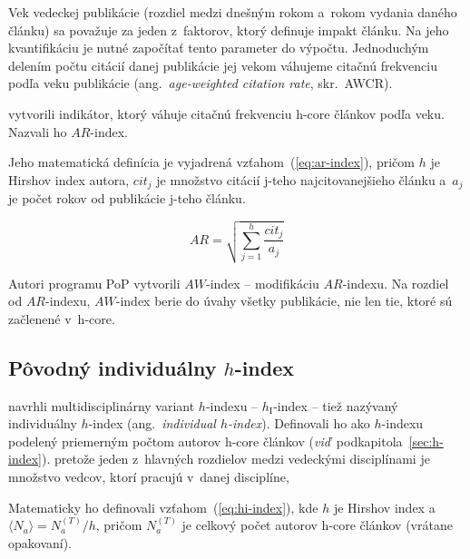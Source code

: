 Vek vedeckej publikácie (rozdiel medzi dnešným rokom a~rokom vydania daného
článku) sa považuje za jeden z~faktorov, ktorý definuje impakt článku.  Na jeho
kvantifikáciu je nutné započítať tento parameter do výpočtu.  Jednoduchým
delením počtu citácií danej publikácie jej vekom váhujeme citačnú frekvenciu
podľa veku publikácie (ang.~\emph{age-weighted citation rate}, skr.~AWCR).

\citet{Jin2007} vytvorili indikátor, ktorý váhuje citačnú frekvenciu h-core
článkov podľa veku.  Nazvali ho $\mathit{AR}$-index.

Jeho matematická definícia je vyjadrená vzťahom~(\ref{eq:ar-index}), pričom $h$
je Hirshov index autora, $\mathit{cit}_j$ je množstvo citácií j-teho
najcitovanejšieho článku a~$a_j$ je počet rokov od publikácie j-teho článku.

\begin{equation}
\label{eq:ar-index}
\mathit{AR} = \sqrt{\sum_{j=1}^h{\frac{\mathit{cit}_j}{a_j}}}
\end{equation}

Autori programu PoP 
vytvorili $\mathit{AW}$-index -- modifikáciu $\mathit{AR}$-indexu.  Na rozdiel
od $\mathit{AR}$-indexu, $\mathit{AW}$-index berie do úvahy všetky publikácie,
nie len tie, ktoré sú začlenené v~h-core.


\subsection{Pôvodný individuálny $h$-index}
\label{sec:hi-index}

\citet{Batista2006} navrhli multidisciplinárny variant
$h$-indexu -- $h_{\mathrm{I}}$-index -- tiež nazývaný individuálny $h$-index
(ang.~\emph{individual $h$-index}).  Definovali ho ako $h$-indexu podelený
priemerným počtom autorov h-core článkov
(\emph{viď}~podkapitola~\ref{sec:h-index}).  pretože jeden z~hlavných rozdielov
medzi vedeckými disciplínami je množstvo vedcov, ktorí pracujú v~danej
disciplíne,


Matematicky ho definovali vzťahom~(\ref{eq:hi-index}), kde $h$ je Hirshov index
a $\langle N_a \rangle = N_a^{(T)} / h$, pričom $N_a^{(T)}$ je celkový počet
autorov h-core článkov (vrátane opakovaní).

